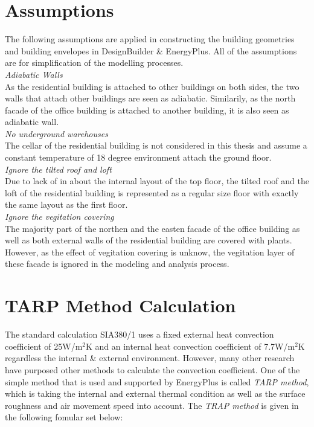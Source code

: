 \documentclass[a4paper, oneside]{discothesis}
\begin{document}



\appendix

\chapter{Assumptions}\label{sec:assumptions}

	The following assumptions are applied in constructing the building geometries and building envelopes in DesignBuilder \& EnergyPlus. All of the assumptions are for simplification of the modelling processes.\\ 

	\textit{Adiabatic Walls}\\
	As the residential building is attached to other buildings on both sides, the two walls that attach other buildings are seen as adiabatic. Similarily, as the north facade of the office building is attached to another building, it is also seen as adiabatic wall.\\

	\textit{No underground warehouses}\\
	The cellar of the residential building is not considered in this thesis and assume a constant temperature of 18 degree environment attach the ground floor.\\

	\textit{Ignore the tilted roof and loft}\\
	Due to lack of in about the internal layout of the top floor, the tilted roof and the loft of the residential building is represented as a regular size floor with exactly the same layout as the first floor.\\

	\textit{Ignore the vegitation covering}\\
	The majority part of the northen and the easten facade of the office building as well as both external walls of the residential building are covered with plants. However, as the effect of vegitation covering is unknow, the vegitation layer of these facade is ignored in the modeling and analysis process.\\


\chapter{TARP Method Calculation}\label{sec:tarp}
	The standard calculation SIA380/1 uses a fixed external heat convection coefficient of 25W/m$^2$K and an internal heat convection coefficient of 7.7W/m$^2$K regardless the internal \& external environment. However, many other research have purposed other methods to calculate the convection coefficient. One of the simple method that is used and supported by EnergyPlus is called \textit{TARP method}, which is taking the internal and external thermal condition as well as the surface roughness and air movement speed into account. The \textit{TRAP method} is given in the following fomular set below: \\
\end{document}
